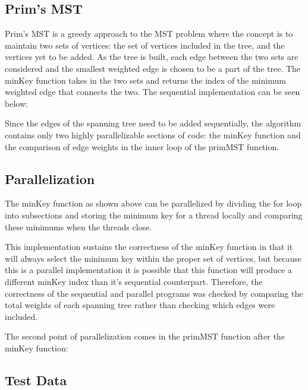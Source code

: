 \documentclass[conference]{IEEEtran}
\begin{document}
\subsection{Prim's MST}
Prim's MST is a greedy approach to the MST problem where the concept is to maintain two sets of vertices: the set of vertices included in the tree, and the vertices yet to be added. As the tree is built, each edge between the two sets are considered and the smallest weighted edge is chosen to be a part of the tree. The minKey function takes in the two sets and returns the index of the minimum weighted edge that connects the two. The sequential implementation can be seen below:



Since the edges of the spanning tree need to be added sequentially, the algorithm contains only two highly parallelizable sections of code: the minKey function and the comparison of edge weights in the inner loop of the primMST function.
\newpage

\subsection{Parallelization}
The minKey function as shown above can be parallelized by dividing the for loop into subsections and storing the minimum key for a thread locally and comparing these minimums when the threads close.



This implementation sustains the correctness of the minKey function in that it will always select the minimum key within the proper set of vertices, but because this is a parallel implementation it is possible that this function will produce a different minKey index than it's sequential counterpart. Therefore, the correctness of the sequential and parallel programs was checked by comparing the total weights of each spanning tree rather than checking which edges were included.
\par
The second point of parallelization comes in the primMST function after the minKey function:


\subsection{Test Data}
\end{document}
